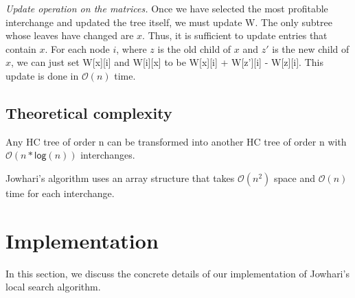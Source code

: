 \documentclass[unnumsec,webpdf,contemporary,large,numbered]{oup-authoring-template}%
\theoremstyle{thmstyleone}%
\theoremstyle{thmstyletwo}%
\theoremstyle{thmstylethree}%
\begin{document}
\textit{Update operation on the matrices.}
Once we have selected the most profitable interchange and updated the tree itself, we must update {\sf W}. The only subtree whose leaves have changed are $x$. Thus, it is sufficient to update entries that contain $x$. For each node $i$, where $z$ is the old child of $x$ and $z'$ is the new child of $x$, we can just set {\sf W[x][i]} and {\sf W[i][x]} to be {\sf W[x][i] + W[z'][i] - W[z][i]}. This update is done in $\mathcal{O}(n)$ time.

\subsection{Theoretical complexity}
Any HC tree of order n can be transformed into another HC tree of order n with $\mathcal{O}(n * \mathsf{log} (n)) $ interchanges.

Jowhari's algorithm uses an array structure that takes $\mathcal{O}(n^2)$ space and $\mathcal{O}(n)$ time for each interchange.


\section{Implementation} \label{sec:implementation}
In this section, we discuss the concrete details of our implementation of Jowhari's local search algorithm. 
\end{document}
